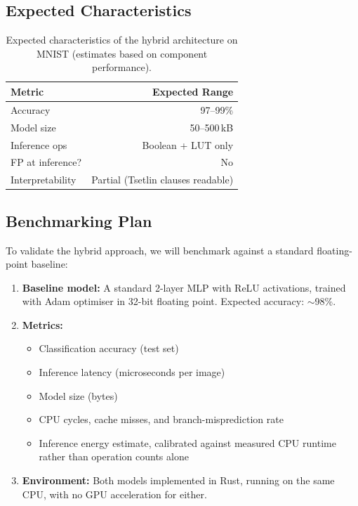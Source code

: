 \subsection{Expected Characteristics}

\begin{table}[htbp]
\centering
\caption{Expected characteristics of the hybrid architecture on MNIST
  (estimates based on component performance).}
\label{tab:hybrid-expected}
\begin{tabular}{@{}lr@{}}
  \toprule
  \textbf{Metric} & \textbf{Expected Range} \\
  \midrule
  Accuracy          & 97--99\% \\
  Model size         & 50--500\,kB \\
  Inference ops      & Boolean + LUT only \\
  FP at inference?   & No \\
  Interpretability   & Partial (Tsetlin clauses readable) \\
  \bottomrule
\end{tabular}
\end{table}

\subsection{Benchmarking Plan}

To validate the hybrid approach, we will benchmark against a standard
floating-point baseline:

\begin{enumerate}[leftmargin=2em]
  \item \textbf{Baseline model:} A standard 2-layer MLP with ReLU
    activations, trained with Adam optimiser in 32-bit floating
    point. Expected accuracy: $\sim$98\%.
  \item \textbf{Metrics:}
    \begin{itemize}[leftmargin=1em]
      \item Classification accuracy (test set)
      \item Inference latency (microseconds per image)
      \item Model size (bytes)
      \item CPU cycles, cache misses, and branch-misprediction rate
      \item Inference energy estimate, calibrated against measured CPU
        runtime rather than operation counts alone
    \end{itemize}
  \item \textbf{Environment:} Both models implemented in Rust, running
    on the same CPU, with no GPU acceleration for either.
\end{enumerate}
